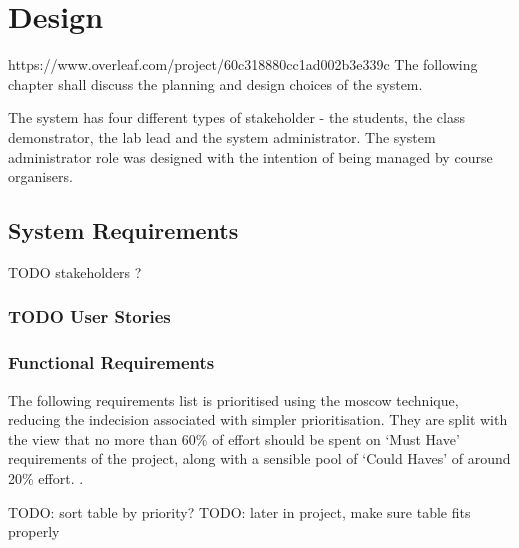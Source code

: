 \chapter{Design}
https://www.overleaf.com/project/60c318880cc1ad002b3e339c
The following chapter shall discuss the planning and design choices of the system. 

The system has four different types of stakeholder - the students, the class demonstrator, the lab lead and the system administrator. The system administrator role was designed with the intention of being managed by course organisers.

\section{System Requirements}

TODO stakeholders ?

\subsection{TODO User Stories}

\newpage
\subsection{Functional Requirements}

The following requirements list is prioritised using the \gls{moscow} technique, reducing the indecision associated with simpler prioritisation. They are split with the view that no more than 60\% of effort should be spent on `Must Have' requirements of the project, along with a sensible pool of `Could Haves' of around 20\% effort. \cite{dsdm}.

TODO: sort table by priority?
TODO: later in project, make sure table fits properly

